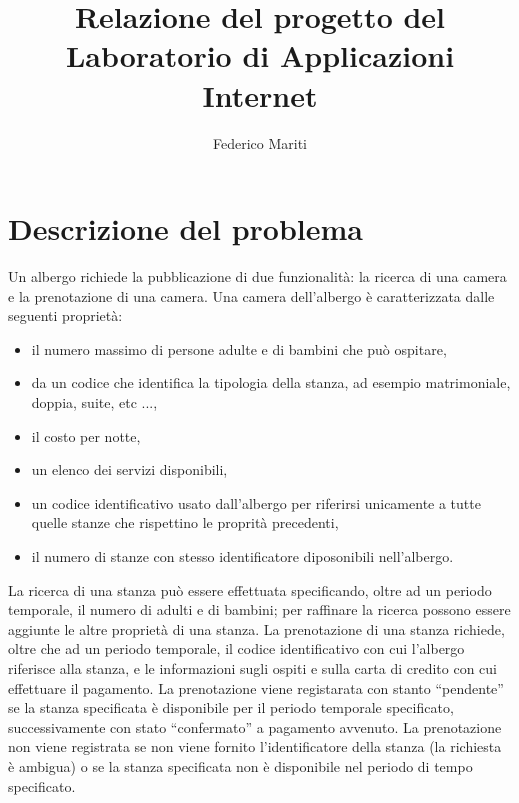 \documentclass[a4paper]{article}
\title{Relazione del progetto del Laboratorio di Applicazioni Internet}
\author{Federico Mariti}
\begin{document}
\maketitle

\section{Descrizione del problema}
\label{sec:descrizione}
Un albergo richiede la pubblicazione di due funzionalit\`a: la ricerca
di una camera e la prenotazione di una camera. Una camera dell'albergo
\`e caratterizzata dalle seguenti propriet\`a:
\begin{itemize}
\item il numero massimo di persone adulte e di bambini che
  pu\`o ospitare, 
\item da un codice che identifica la tipologia della stanza, ad
  esempio matrimoniale, doppia, suite, etc ...,
\item il costo per notte,
\item un elenco dei servizi disponibili,
\item un codice identificativo usato dall'albergo per riferirsi
  unicamente a tutte quelle stanze che rispettino le proprit\`a
  precedenti,
\item il numero di stanze con stesso identificatore diposonibili
  nell'albergo.
\end{itemize}
La ricerca di una stanza pu\`o essere effettuata specificando, oltre
ad un periodo temporale, il numero di adulti e di bambini; per
raffinare la ricerca possono essere aggiunte le altre propriet\`a di
una stanza. La prenotazione di una stanza richiede, oltre che ad un
periodo temporale, il codice identificativo con cui l'albergo
riferisce alla stanza, e le informazioni sugli ospiti e sulla carta di
credito con cui effettuare il pagamento. La prenotazione viene
registarata con stanto ``pendente'' se la stanza specificata \`e
disponibile per il periodo temporale specificato, successivamente con
stato ``confermato'' a pagamento avvenuto. La prenotazione non viene
registrata se non viene fornito l'identificatore della stanza (la
richiesta \`e ambigua) o se la stanza specificata non \`e disponibile
nel periodo di tempo specificato.

\end{document}
